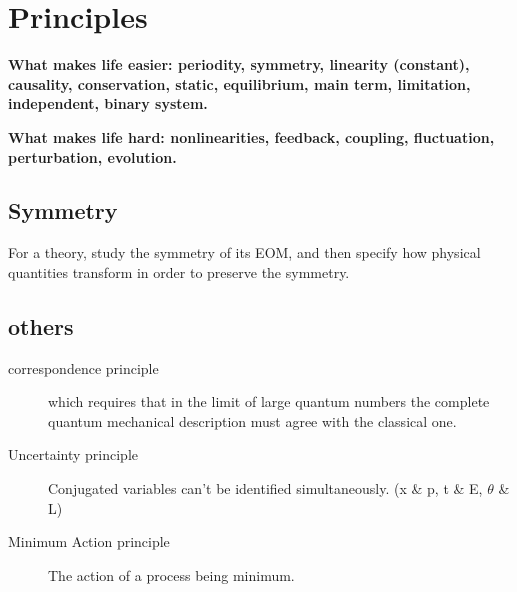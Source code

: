 \section{Principles}
\textbf{What makes life easier: periodity, symmetry, linearity (constant), causality, conservation, static, equilibrium, main term, limitation, independent, binary system.}

\textbf{What makes life hard: nonlinearities, feedback, coupling, 
fluctuation, perturbation, evolution.}

\subsection{Symmetry}
For a theory, study the symmetry of its EOM, and then specify how physical quantities transform in order to preserve the symmetry.




\subsection{others}
\begin{description}
    \item[correspondence principle]
	which requires that in the limit of large quantum numbers the 
	complete quantum mechanical description must agree with the 
	classical one.
    \item[Uncertainty principle]
	Conjugated variables can't be identified simultaneously. (x \& p, t \& E, $\theta$ \& L)
    \item[Minimum Action principle]
	The action of a process being minimum.
\end{description}
